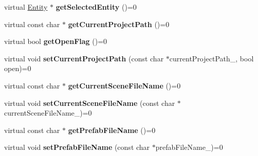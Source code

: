 \begin{DoxyCompactItemize}
\item 
virtual \hyperlink{class_magnum_1_1_entity}{Entity} $\ast$ {\bfseries get\+Selected\+Entity} ()=0\hypertarget{class_magnum_1_1_project_model_base_a0172ce944425c14d0ff49c2a7ef4550b}{}\label{class_magnum_1_1_project_model_base_a0172ce944425c14d0ff49c2a7ef4550b}

\item 
virtual const char $\ast$ {\bfseries get\+Current\+Project\+Path} ()=0\hypertarget{class_magnum_1_1_project_model_base_a15fa5d5a3af0b7def64a8a0c1c2b26e1}{}\label{class_magnum_1_1_project_model_base_a15fa5d5a3af0b7def64a8a0c1c2b26e1}

\item 
virtual bool {\bfseries get\+Open\+Flag} ()=0\hypertarget{class_magnum_1_1_project_model_base_a4f5b1f8d3a32264b02ae9037d8019309}{}\label{class_magnum_1_1_project_model_base_a4f5b1f8d3a32264b02ae9037d8019309}

\item 
virtual void {\bfseries set\+Current\+Project\+Path} (const char $\ast$current\+Project\+Path\+\_\+, bool open)=0\hypertarget{class_magnum_1_1_project_model_base_a68e6aac4cc9a2668bac361e7147f51a1}{}\label{class_magnum_1_1_project_model_base_a68e6aac4cc9a2668bac361e7147f51a1}

\item 
virtual const char $\ast$ {\bfseries get\+Current\+Scene\+File\+Name} ()=0\hypertarget{class_magnum_1_1_project_model_base_a39eef830f14a7b52528ad76d6e394c3d}{}\label{class_magnum_1_1_project_model_base_a39eef830f14a7b52528ad76d6e394c3d}

\item 
virtual void {\bfseries set\+Current\+Scene\+File\+Name} (const char $\ast$current\+Scene\+File\+Name\+\_\+)=0\hypertarget{class_magnum_1_1_project_model_base_ae3e40090f7fa0dd2a4c363e756aad43a}{}\label{class_magnum_1_1_project_model_base_ae3e40090f7fa0dd2a4c363e756aad43a}

\item 
virtual const char $\ast$ {\bfseries get\+Prefab\+File\+Name} ()=0\hypertarget{class_magnum_1_1_project_model_base_a28c1e55f19c2c99eb2701842839cbf12}{}\label{class_magnum_1_1_project_model_base_a28c1e55f19c2c99eb2701842839cbf12}

\item 
virtual void {\bfseries set\+Prefab\+File\+Name} (const char $\ast$prefab\+File\+Name\+\_\+)=0\hypertarget{class_magnum_1_1_project_model_base_a60c6ac6e14672ad2acf7d6f4d107adc1}{}\label{class_magnum_1_1_project_model_base_a60c6ac6e14672ad2acf7d6f4d107adc1}


\end{DoxyCompactItemize}
